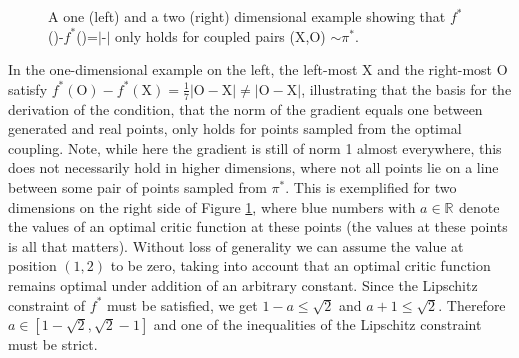 \documentclass{article} %
\newcommand{\RR}[1][]{\mathbb{R}^{#1}}
\newcommand{\norm}[1]{||{#1}||_2}
\newcommand{\hp}[1]{\textcolor{red}{#1}}
\begin{document}
\begin{figure}[h]
\begin{center}
{}
\caption{
A one (left) and a two (right) dimensional example showing
that $f^*$()-$f^*$()=$|$-$|$ only holds for coupled pairs (X,O) $\sim \pi^*$.
}
\label{CouplingsOnly}
\end{center}
\end{figure}


In the one-dimensional example on the left, 
the left-most X and the right-most O satisfy $f^*(\text{O})-f^*(\text{X})=\frac{1}{7}|\text{O}-\text{X}| \neq |\text{O}-\text{X}|$, illustrating that the basis for the derivation of the condition, that the norm of the gradient equals one between generated and real points, only holds for points sampled from the optimal coupling. Note, while here the gradient is still of norm 1 almost everywhere, this does not necessarily hold in higher dimensions, where not all points lie on a line between some pair of points sampled from $\pi^*$. This is exemplified for two dimensions on the right side of Figure \ref{CouplingsOnly}, where
blue numbers with $a\in\RR$ denote the values of an optimal critic function at these points (the values at these points is all that matters). 
Without loss of generality we can assume
the value at position $(1,2)$ to be zero, taking into account that an optimal critic function remains optimal under addition of an arbitrary constant. 
%
Since the Lipschitz constraint of $f^*$ must be satisfied, we get $1-a\leq \sqrt{2}$ and $a+1\leq \sqrt{2}$. Therefore $a\in [1-\sqrt{2} ,\sqrt{2}-1]$ and one of the inequalities of the Lipschitz constraint must be strict.%
\end{document}
